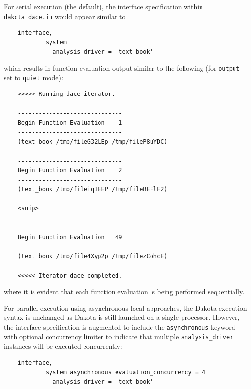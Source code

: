 For serial execution (the default), the interface specification within
\texttt{dakota\_dace.in} would appear similar to
\begin{small}
\begin{verbatim}
    interface,
            system
              analysis_driver = 'text_book'
\end{verbatim}
\end{small}

which results in function evaluation output similar to the following
(for \texttt{output} set to \texttt{quiet} mode):
\begin{small}
\begin{verbatim}
    >>>>> Running dace iterator.

    ------------------------------
    Begin Function Evaluation    1
    ------------------------------
    (text_book /tmp/fileG32LEp /tmp/fileP8uYDC)

    ------------------------------
    Begin Function Evaluation    2
    ------------------------------
    (text_book /tmp/fileiqIEEP /tmp/fileBEFlF2)

    <snip>

    ------------------------------
    Begin Function Evaluation   49
    ------------------------------
    (text_book /tmp/file4Xyp2p /tmp/filezCohcE)

    <<<<< Iterator dace completed.
\end{verbatim}
\end{small}
where it is evident that each function evaluation is being performed
sequentially.

For parallel execution using asynchronous local approaches, the Dakota
execution syntax is unchanged as Dakota is still launched on a single
processor.  However, the interface specification is augmented to
include the \texttt{asynchronous} keyword with optional concurrency
limiter to indicate that multiple \texttt{analysis\_driver} instances
will be executed concurrently:
\begin{small}
\begin{verbatim}
    interface,
            system asynchronous evaluation_concurrency = 4
              analysis_driver = 'text_book'
\end{verbatim}
\end{small}


